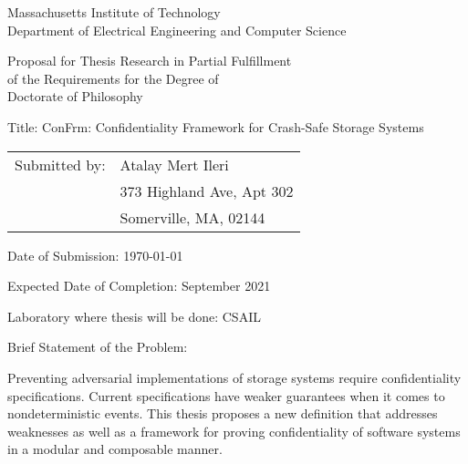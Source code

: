 \begin{spacing}{1}
  \begin{titlepage}
    \begin{center}
      Massachusetts Institute of Technology\\
      Department of Electrical Engineering and Computer Science%
    \end{center}

    \begin{center}
      Proposal for Thesis Research in Partial Fulfillment\\
      of the Requirements for the Degree of\\
      Doctorate of Philosophy%
    \end{center}

    \begin{flushleft}
    Title: ConFrm: Confidentiality Framework for Crash-Safe Storage Systems

    \vspace{\baselineskip}
    \begin{tabular}{@{}ll}
      Submitted by: & Atalay Mert Ileri\\
      &373 Highland Ave, Apt 302\\
      &Somerville, MA, 02144\\
    \end{tabular}

    
    \vspace{\baselineskip}
    Date of Submission: \today

    \vspace{\baselineskip}
    Expected Date of Completion: September 2021

    \vspace{\baselineskip}
    Laboratory where thesis will be done: CSAIL

    \vspace{\baselineskip}
    Brief Statement of the Problem:
    \end{flushleft}

    \noindent
    Preventing adversarial implementations of storage systems require 
    confidentiality specifications. Current specifications have weaker guarantees when it comes to nondeterministic events. This thesis proposes a new definition that addresses weaknesses as well as a framework for proving confidentiality of software systems in a modular and composable manner. 
    
  \end{titlepage}
\end{spacing}